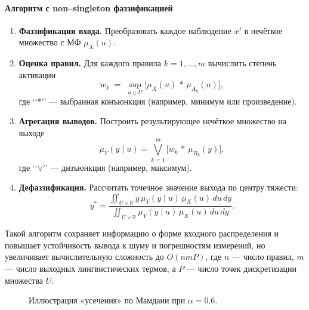 \paragraph{Алгоритм с non–singleton фаззификацией}
\begin{enumerate}
  \item \textbf{Фаззификация входа.} Преобразовать каждое наблюдение $x'$ в нечёткое множество с МФ $\mu_X(u)$.
  \item \textbf{Оценка правил.} Для каждого правила $k=1,\dots,m$ вычислить степень активации
  \[
    w_k \;=\;\sup_{u\in U}\bigl[\mu_X(u)\,\ast\,\mu_{A_k}(u)\bigr],
  \]
  где ‘‘$\ast$’’ — выбранная конъюнкция (например, минимум или произведение).
  \item \textbf{Агрегация выводов.} Построить результирующее нечёткое множество на выходе
  \[
    \mu_Y(y\mid u)
    = \bigvee_{k=1}^{m}\bigl[w_k \,\ast\, \mu_{B_k}(y)\bigr],
  \]
  где ‘‘$\vee$’’ — дизъюнкция (например, максимум).
  \item \textbf{Дефаззификация.} Рассчитать точечное значение выхода по центру тяжести:
  \[
    y^* 
    = 
    \frac{\displaystyle\iint_{U\times\mathbb R}
      y\,\mu_Y(y\mid u)\,\mu_X(u)\,du\,dy}
         {\displaystyle\iint_{U\times\mathbb R}
      \mu_Y(y\mid u)\,\mu_X(u)\,du\,dy}.
  \]
\end{enumerate}

Такой алгоритм сохраняет информацию о форме входного распределения и повышает устойчивость вывода к шуму и погрешностям измерений, но увеличивает вычислительную сложность до $O(nmP)$, где $n$ — число правил, $m$ — число выходных лингвистических термов, а $P$ — число точек дискретизации множества $U$.

\begin{figure}[H]
  \centering
  \caption{Иллюстрация «усечения» по Мамдани при $\alpha=0.6$.}
\end{figure}


